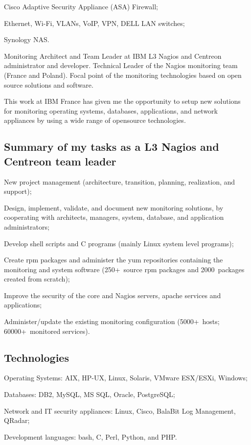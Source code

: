 \item{\bdot} Cisco Adaptive Security Appliance (ASA) Firewall;
\item{\bdot} Ethernet, Wi-Fi, VLANs, VoIP, VPN, DELL LAN switches;
\item{\bdot} Synology NAS.


\bigskip
{}
   {Monitoring Architect and Team Leader at IBM}
L3 Nagios and Centreon administrator and developer.
Technical Leader of the Nagios monitoring team (France and Poland).
Focal point of the monitoring technologies based on open source solutions and
software.

This work at IBM France has given me the opportunity to setup new solutions 
for monitoring operating systems, databases, applications, and network 
appliances by using a wide range of opensource technologies.

\subsection{Summary of my tasks as a L3 Nagios and Centreon team leader}

\item{\bdot} New project management (architecture, transition, planning, 
   realization, and support);
\item{\bdot} Design, implement, validate, and document new monitoring solutions,
   by cooperating with architects, managers, system, database, and application 
   administrators;
\item{\bdot} Develop shell scripts and C programs (mainly Linux system level
   programs);
\item{\bdot} Create rpm packages and administer the yum repositories containing
   the monitoring and system software (250+~source rpm packages and  
   2000~packages created from scratch);
\item{\bdot} Improve the security of the core and Nagios servers, apache 
   services and applications;
\item{\bdot} Administer/update the existing monitoring configuration 
   (5000+~hosts; 60000+~monitored services).

\subsection{Technologies}

\item{\bdot} Operating Systems: AIX, HP-UX, Linux, Solaris, VMware ESX/ESXi, Windows;
\item{\bdot} Databases: DB2, MySQL, MS SQL, Oracle, PostgreSQL;
\item{\bdot} Network and IT security appliances: Linux, Cisco, BalaBit Log Management, 
   QRadar;
\item{\bdot} Development languages: bash, C, Perl, Python, and PHP.

